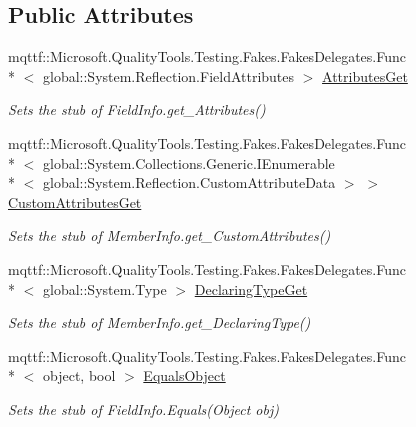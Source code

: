 \subsection*{Public Attributes}
\begin{DoxyCompactItemize}
\item 
mqttf\-::\-Microsoft.\-Quality\-Tools.\-Testing.\-Fakes.\-Fakes\-Delegates.\-Func\\*
$<$ global\-::\-System.\-Reflection.\-Field\-Attributes $>$ \hyperlink{class_system_1_1_reflection_1_1_fakes_1_1_stub_field_info_a3e9c78d9a96102aaec573b34d4c1a95b}{Attributes\-Get}
\begin{DoxyCompactList}\small\item\em Sets the stub of Field\-Info.\-get\-\_\-\-Attributes()\end{DoxyCompactList}\item 
mqttf\-::\-Microsoft.\-Quality\-Tools.\-Testing.\-Fakes.\-Fakes\-Delegates.\-Func\\*
$<$ global\-::\-System.\-Collections.\-Generic.\-I\-Enumerable\\*
$<$ global\-::\-System.\-Reflection.\-Custom\-Attribute\-Data $>$ $>$ \hyperlink{class_system_1_1_reflection_1_1_fakes_1_1_stub_field_info_abec9b027185a5fd80b2cf3fa99432216}{Custom\-Attributes\-Get}
\begin{DoxyCompactList}\small\item\em Sets the stub of Member\-Info.\-get\-\_\-\-Custom\-Attributes()\end{DoxyCompactList}\item 
mqttf\-::\-Microsoft.\-Quality\-Tools.\-Testing.\-Fakes.\-Fakes\-Delegates.\-Func\\*
$<$ global\-::\-System.\-Type $>$ \hyperlink{class_system_1_1_reflection_1_1_fakes_1_1_stub_field_info_a1a65c583540c41add9d9ecf26ae1409a}{Declaring\-Type\-Get}
\begin{DoxyCompactList}\small\item\em Sets the stub of Member\-Info.\-get\-\_\-\-Declaring\-Type()\end{DoxyCompactList}\item 
mqttf\-::\-Microsoft.\-Quality\-Tools.\-Testing.\-Fakes.\-Fakes\-Delegates.\-Func\\*
$<$ object, bool $>$ \hyperlink{class_system_1_1_reflection_1_1_fakes_1_1_stub_field_info_a8552b53a5befc4f4ae6679f4123e9e3d}{Equals\-Object}
\begin{DoxyCompactList}\small\item\em Sets the stub of Field\-Info.\-Equals(\-Object obj)\end{DoxyCompactList}\item 

\end{DoxyCompactItemize}
